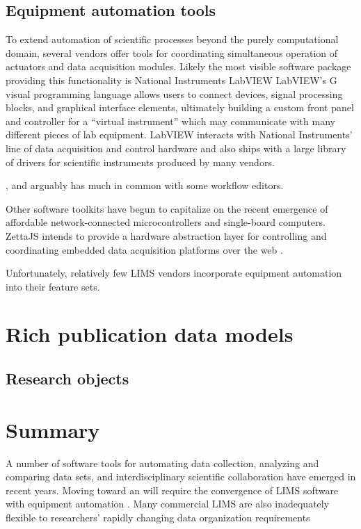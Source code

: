 \documentclass[../thesis]{subfiles}
\begin{document}
\subsection{Equipment automation tools}

To extend automation of scientific processes beyond the purely
computational domain, several vendors offer tools for coordinating
simultaneous operation of actuators and data acquisition modules.
Likely the most visible software package providing this functionality
is National Instruments LabVIEW \cite{ELLIOTT2007}
LabVIEW's G visual programming language allows users to connect
devices, signal processing blocks, and graphical interface elements,
ultimately building a custom front panel and controller for a
``virtual instrument'' which may communicate with many different
pieces of lab equipment. LabVIEW interacts with National Instruments'
line of data acquisition and control hardware and also ships with a
large library of drivers for scientific instruments produced by many
vendors.

, and arguably has much in common
with some workflow editors.

Other software toolkits have begun to capitalize on
the recent emergence of affordable network-connected microcontrollers
and single-board computers.
ZettaJS intends to provide a hardware abstraction layer for
controlling and coordinating embedded data acquisition platforms over
the web \cite{ZettaJS}.


Unfortunately, relatively few \gls{LIMS} vendors incorporate equipment
automation into their feature sets.



\section{Rich publication data models}

\subsection{Research objects}







\section{Summary}

A number of software tools for automating data collection, analyzing
and comparing data sets, and interdisciplinary scientific
collaboration have emerged in recent years. Moving toward an    will
require the convergence of \gls{LIMS} software with equipment automation .
Many commercial \gls{LIMS} are also inadequately flexible to researchers'
rapidly changing data organization requirements
\end{document}
